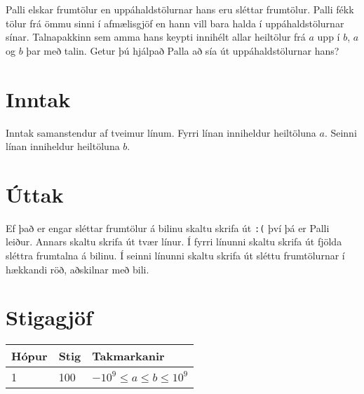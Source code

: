 
Palli elskar frumtölur en uppáhaldstölurnar hans eru sléttar frumtölur.
Palli fékk tölur frá ömmu sinni í afmælisgjöf en hann vill bara halda í uppáhaldstölurnar sínar.
Talnapakkinn sem amma hans keypti innihélt allar heiltölur frá $a$ upp í $b$, $a$ og $b$ þar með talin.
Getur þú hjálpað Palla að sía út uppáhaldstölurnar hans?

\section*{Inntak}
Inntak samanstendur af tveimur línum.
Fyrri línan inniheldur heiltöluna $a$.
Seinni línan inniheldur heiltöluna $b$.

\section*{Úttak}
Ef það er engar sléttar frumtölur á bilinu skaltu skrifa út \texttt{:(} því þá er Palli leiður.
Annars skaltu skrifa út tvær línur.
Í fyrri línunni skaltu skrifa út fjölda sléttra frumtalna á bilinu.
Í seinni línunni skaltu skrifa út sléttu frumtölurnar í hækkandi röð, aðskilnar með bili.

\section*{Stigagjöf}
\begin{tabular}{|l|l|l|}
\hline
Hópur & Stig & Takmarkanir \\ \hline
1     & 100  & $-10^9 \leq a \leq b \leq 10^9$ \\ \hline
\end{tabular}

